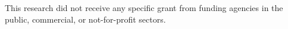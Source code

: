 \documentclass[12pt, a4paper]{article}
\begin{document}
\begin{titlepage}

\maketitle
\thispagestyle{empty}
\centering
    This research did not receive any specific grant from funding agencies in the public, commercial, or not-for-profit sectors.
\clearpage
\thispagestyle{empty}
\RaggedRight










\end{titlepage}
\end{document}
